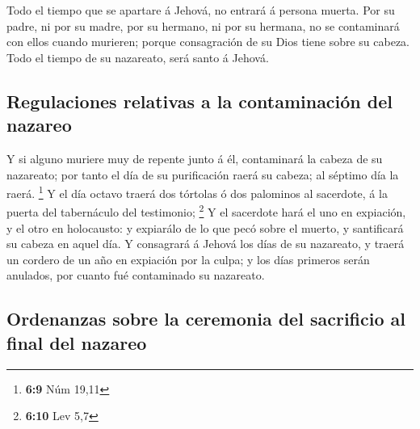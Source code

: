  Todo el tiempo que se apartare á Jehová, no entrará á
persona muerta.  Por su padre, ni por su madre, por su
hermano, ni por su hermana, no se contaminará con ellos cuando murieren;
porque consagración de su Dios tiene sobre su cabeza.  Todo
el tiempo de su nazareato, será santo á Jehová.

\hypertarget{regulaciones-relativas-a-la-contaminaciuxf3n-del-nazareo}{%
\subsection{Regulaciones relativas a la contaminación del
nazareo}\label{regulaciones-relativas-a-la-contaminaciuxf3n-del-nazareo}}

 Y si alguno muriere muy de repente junto á él, contaminará
la cabeza de su nazareato; por tanto el día de su purificación raerá su
cabeza; al séptimo día la raerá. \footnote{\textbf{6:9} Núm 19,11}
 Y el día octavo traerá dos tórtolas ó dos palominos al
sacerdote, á la puerta del tabernáculo del testimonio; \footnote{\textbf{6:10}
  Lev 5,7}  Y el sacerdote hará el uno en expiación, y el
otro en holocausto: y expiarálo de lo que pecó sobre el muerto, y
santificará su cabeza en aquel día.  Y consagrará á Jehová
los días de su nazareato, y traerá un cordero de un año en expiación por
la culpa; y los días primeros serán anulados, por cuanto fué contaminado
su nazareato.

\hypertarget{ordenanzas-sobre-la-ceremonia-del-sacrificio-al-final-del-nazareo}{%
\subsection{Ordenanzas sobre la ceremonia del sacrificio al final del
nazareo}\label{ordenanzas-sobre-la-ceremonia-del-sacrificio-al-final-del-nazareo}}


